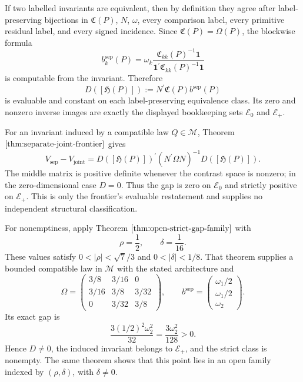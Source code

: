 If two labelled invariants are equivalent, then by definition they agree after label-preserving bijections in \(\mathfrak C(P)\), \(N\), \(\omega\), every comparison label, every primitive residual label, and every signed incidence. Since \(\mathfrak C(P)=\Omega(P)\), the blockwise formula
\[
 b_k^{\mathrm{sep}}(P)
 =\omega_k\frac{\mathfrak C_{kk}(P)^{-1}\mathbf 1}
 {\mathbf 1^{\prime}\mathfrak C_{kk}(P)^{-1}\mathbf 1}
\]
is computable from the invariant. Therefore
\[
 D([\mathfrak H(P)])
 :=N^{\prime}\mathfrak C(P)b^{\mathrm{sep}}(P)
\]
is evaluable and constant on each label-preserving equivalence class. Its zero and nonzero inverse images are exactly the displayed bookkeeping sets \(\mathscr E_0\) and \(\mathscr E_+\).

For an invariant induced by a compatible law \(Q\in\mathcal M\), Theorem \(\ref{thm:separate-joint-frontier}\) gives
\[
 V_{\mathrm{sep}}-V_{\mathrm{joint}}
 =D([\mathfrak H(P)])^{\prime}
  (N^{\prime}\Omega N)^{-1}
  D([\mathfrak H(P)]).
\]
The middle matrix is positive definite whenever the contrast space is nonzero; in the zero-dimensional case \(D=0\). Thus the gap is zero on \(\mathscr E_0\) and strictly positive on \(\mathscr E_+\). This is only the frontier's evaluable restatement and supplies no independent structural classification.

For nonemptiness, apply Theorem \(\ref{thm:open-strict-gap-family}\) with
\[
 \rho=\frac12,
 \qquad
 \delta=\frac1{16}.
\]
These values satisfy \(0<|\rho|<\sqrt7/3\) and \(0<|\delta|<1/8\). That theorem supplies a bounded compatible law in \(\mathcal M\) with the stated architecture and
\[
 \Omega=
 \begin{pmatrix}
 3/8&3/16&0\\
 3/16&3/8&3/32\\
 0&3/32&3/8
 \end{pmatrix},
 \qquad
 b^{\mathrm{sep}}
 =\begin{pmatrix}\omega_1/2\\\omega_1/2\\\omega_2\end{pmatrix}.
\]
Its exact gap is
\[
 \frac{3(1/2)^2\omega_2^2}{32}
 =\frac{3\omega_2^2}{128}>0.
\]
Hence \(D\ne0\), the induced invariant belongs to \(\mathscr E_+\), and the strict class is nonempty. The same theorem shows that this point lies in an open family indexed by \((\rho,\delta)\), with \(\delta\ne0\).